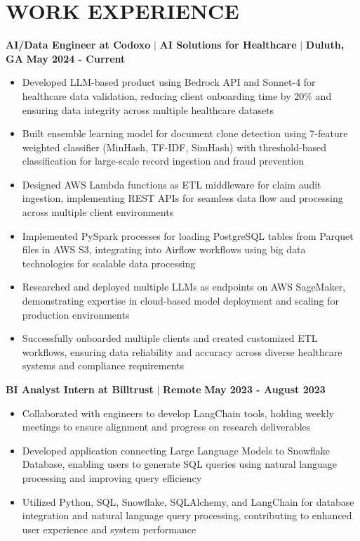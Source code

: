 \documentclass[10pt,a4paper]{article}
\newcommand{\jobtitle}[1]{\noindent\textbf{#1}}
\begin{document}
\section*{WORK EXPERIENCE}
\jobtitle{AI/Data Engineer at Codoxo} $|$ \textbf{AI Solutions for Healthcare} $|$ \textbf{Duluth, GA} \hfill \textbf{May 2024 - Current}
\begin{itemize}
    \item Developed LLM-based product using Bedrock API and Sonnet-4 for healthcare data validation, reducing client onboarding time by 20\% and ensuring data integrity across multiple healthcare datasets
    \item Built ensemble learning model for document clone detection using 7-feature weighted classifier (MinHash, TF-IDF, SimHash) with threshold-based classification for large-scale record ingestion and fraud prevention
    \item Designed AWS Lambda functions as ETL middleware for claim audit ingestion, implementing REST APIs for seamless data flow and processing across multiple client environments
    \item Implemented PySpark processes for loading PostgreSQL tables from Parquet files in AWS S3, integrating into Airflow workflows using big data technologies for scalable data processing
    \item Researched and deployed multiple LLMs as endpoints on AWS SageMaker, demonstrating expertise in cloud-based model deployment and scaling for production environments
    \item Successfully onboarded multiple clients and created customized ETL workflows, ensuring data reliability and accuracy across diverse healthcare systems and compliance requirements
\end{itemize}

\jobtitle{BI Analyst Intern at Billtrust} $|$ \textbf{Remote} \hfill \textbf{May 2023 - August 2023}
\begin{itemize}
    \item Collaborated with engineers to develop LangChain tools, holding weekly meetings to ensure alignment and progress on research deliverables
    \item Developed application connecting Large Language Models to Snowflake Database, enabling users to generate SQL queries using natural language processing and improving query efficiency
    \item Utilized Python, SQL, Snowflake, SQLAlchemy, and LangChain for database integration and natural language query processing, contributing to enhanced user experience and system performance
\end{itemize}
\end{document}
